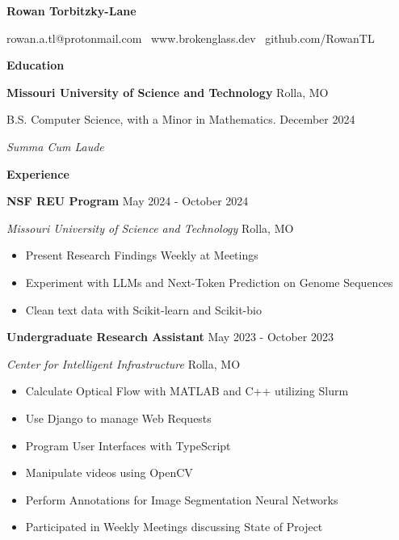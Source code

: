 \documentclass[11pt]{article}
\begin{document}
\begin{center}
    \textbf{\huge Rowan Torbitzky-Lane}\\
    \hrulefill
\end{center}

\begin{center}
    rowan.a.tl@protonmail.com \textbullet \ www.brokenglass.dev \textbullet \ github.com/RowanTL
\end{center}


\begin{center}
    \textbf{Education}
\end{center}
\textbf{Missouri University of Science and Technology} \hfill Rolla, MO

B.S. Computer Science, with a Minor in Mathematics. \hfill December 2024

\textit{Summa Cum Laude}


\begin{center}
    \textbf{Experience}
\end{center}

\textbf{NSF REU Program} \hfill May 2024 - October 2024

\textsl{Missouri University of Science and Technology} \hfill Rolla, MO
\begin{itemize}[noitemsep]
    \item Present Research Findings Weekly at Meetings
    \item Experiment with LLMs and Next-Token Prediction on Genome Sequences
    \item Clean text data with Scikit-learn and Scikit-bio
\end{itemize}

\textbf{Undergraduate Research Assistant} \hfill May 2023 - October 2023

\textsl{Center for Intelligent Infrastructure} \hfill Rolla, MO
\begin{itemize}[noitemsep]
    \item Calculate Optical Flow with MATLAB and C++ utilizing Slurm
    \item Use Django to manage Web Requests
    \item Program User Interfaces with TypeScript
    \item Manipulate videos using OpenCV
    \item Perform Annotations for Image Segmentation Neural Networks
    \item Participated in Weekly Meetings discussing State of Project
\end{itemize}
\end{document}
